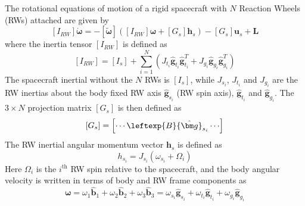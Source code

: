 \documentclass[]{BasiliskReportMemo}
\begin{document}
The rotational equations of motion of a rigid spacecraft with $N$ Reaction Wheels (RWs) attached are given by\cite{schaub}
\begin{equation}
	\label{eq:MS:2}
	[I_{RW}] \dot{\bm \omega} = - [\tilde{\bm \omega}] \left(
	[I_{RW}] \bm\omega + [G_{s}] \bm h_{s}
	\right) - [G_{s}] \bm u_{s} + \bm L
\end{equation}
where  the inertia tensor $[I_{RW}]$ is defined as
\begin{equation}
	\label{eq:MS:3}
	[I_{RW}] = [I_{s}] + \sum_{i=1}^{N} \left (J_{t_{i}} \hat{\bm g}_{t_{i}} \hat{\bm g}_{t_{i}}^{T} + J_{g_{i}} \hat{\bm g}_{g_{i}} \hat{\bm g}_{g_{i}}^{T}
	\right)
\end{equation}
The spacecraft inertial without the $N$ RWs is $[I_{s}]$, while $J_{s_{i}}$, $J_{t_{i}}$ and $J_{g_{i}}$ are the RW inertias about the body fixed RW axis $\hat{\bm g}_{s_{i}}$ (RW spin axis), $\hat{\bm g}_{t_{i}}$ and $\hat{\bm g}_{g_{i}}$.  The $3\times N$ projection matrix $[G_{s}]$ is then defined as
\begin{equation}
	\label{eq:MS:4}
	[G_{s}] = \begin{bmatrix}
		\cdots \leftexp{B}{\hat{\bm g}}_{s_{i}} \cdots
	\end{bmatrix}
\end{equation}
The RW inertial angular momentum vector $\bm h_{s}$ is defined as
\begin{equation}
	\label{eq:MS:5}
	h_{s_{i}} = J_{s_{i}} (\omega_{s_{i}} + \Omega_{i})
\end{equation}
Here $\Omega_{i}$ is the $i^{\text{th}}$ RW spin relative to the spacecraft, and the body angular velocity is written in terms of body and RW frame components as
\begin{equation}
	\label{eq:MS:6}
	\bm\omega = \omega_{1} \hat{\bm b}_{1} + \omega_{2} \hat{\bm b}_{2} + \omega_{3} \hat{\bm b}_{3}
	= \omega_{s_{i}} \hat{\bm g}_{s_{i}} +  \omega_{t_{i}} \hat{\bm g}_{t_{i}} +  \omega_{g_{i}} \hat{\bm g}_{g_{i}}
\end{equation}
\end{document}
